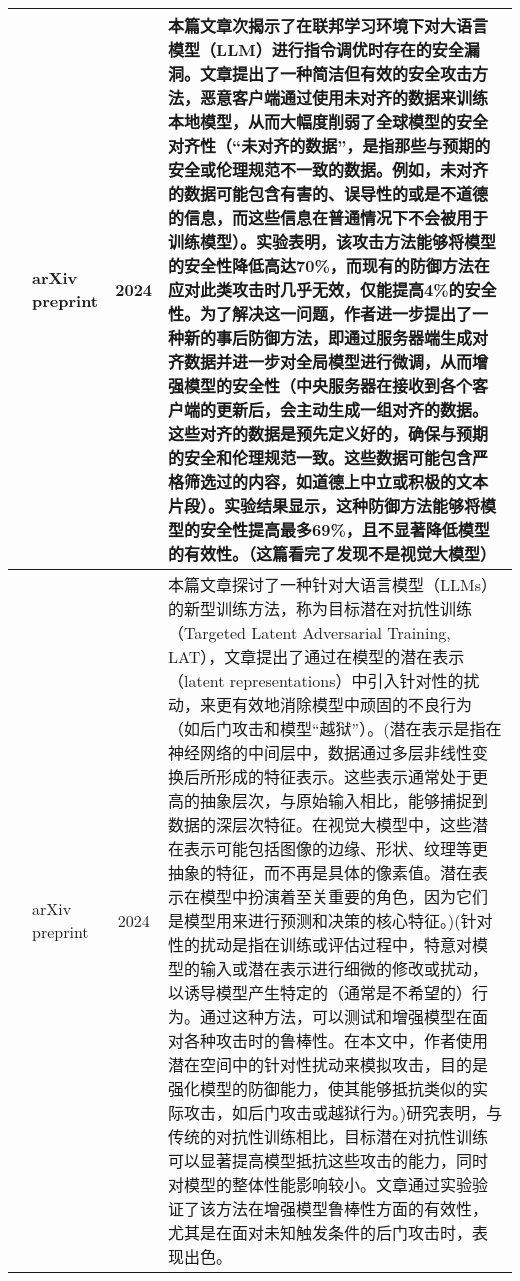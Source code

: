 \documentclass[lettersize,journal]{IEEEtran}
\begin{document}
\begin{longtable}{|c|p{3cm}|c|p{12cm}|}
    
   \cite{attack01} & arXiv preprint & 2024 & 本篇文章次揭示了在联邦学习环境下对大语言模型（LLM）进行指令调优时存在的安全漏洞。文章提出了一种简洁但有效的安全攻击方法，恶意客户端通过使用未对齐的数据来训练本地模型，从而大幅度削弱了全球模型的安全对齐性（“未对齐的数据”，是指那些与预期的安全或伦理规范不一致的数据。例如，未对齐的数据可能包含有害的、误导性的或是不道德的信息，而这些信息在普通情况下不会被用于训练模型）。实验表明，该攻击方法能够将模型的安全性降低高达70\%，而现有的防御方法在应对此类攻击时几乎无效，仅能提高4\%的安全性。为了解决这一问题，作者进一步提出了一种新的事后防御方法，即通过服务器端生成对齐数据并进一步对全局模型进行微调，从而增强模型的安全性（中央服务器在接收到各个客户端的更新后，会主动生成一组对齐的数据。这些对齐的数据是预先定义好的，确保与预期的安全和伦理规范一致。这些数据可能包含严格筛选过的内容，如道德上中立或积极的文本片段）。实验结果显示，这种防御方法能够将模型的安全性提高最多69\%，且不显著降低模型的有效性。（这篇看完了发现不是视觉大模型） \\ \hline
   \cite{attack02} & arXiv preprint & 2024 & 本篇文章探讨了一种针对大语言模型（LLMs）的新型训练方法，称为目标潜在对抗性训练（Targeted Latent Adversarial Training, LAT），文章提出了通过在模型的潜在表示（latent representations）中引入针对性的扰动，来更有效地消除模型中顽固的不良行为（如后门攻击和模型“越狱”）。(潜在表示是指在神经网络的中间层中，数据通过多层非线性变换后所形成的特征表示。这些表示通常处于更高的抽象层次，与原始输入相比，能够捕捉到数据的深层次特征。在视觉大模型中，这些潜在表示可能包括图像的边缘、形状、纹理等更抽象的特征，而不再是具体的像素值。潜在表示在模型中扮演着至关重要的角色，因为它们是模型用来进行预测和决策的核心特征。)(针对性的扰动是指在训练或评估过程中，特意对模型的输入或潜在表示进行细微的修改或扰动，以诱导模型产生特定的（通常是不希望的）行为。通过这种方法，可以测试和增强模型在面对各种攻击时的鲁棒性。在本文中，作者使用潜在空间中的针对性扰动来模拟攻击，目的是强化模型的防御能力，使其能够抵抗类似的实际攻击，如后门攻击或越狱行为。)研究表明，与传统的对抗性训练相比，目标潜在对抗性训练可以显著提高模型抵抗这些攻击的能力，同时对模型的整体性能影响较小。文章通过实验验证了该方法在增强模型鲁棒性方面的有效性，尤其是在面对未知触发条件的后门攻击时，表现出色。  \\ \hline

\end{longtable}
\end{document}
